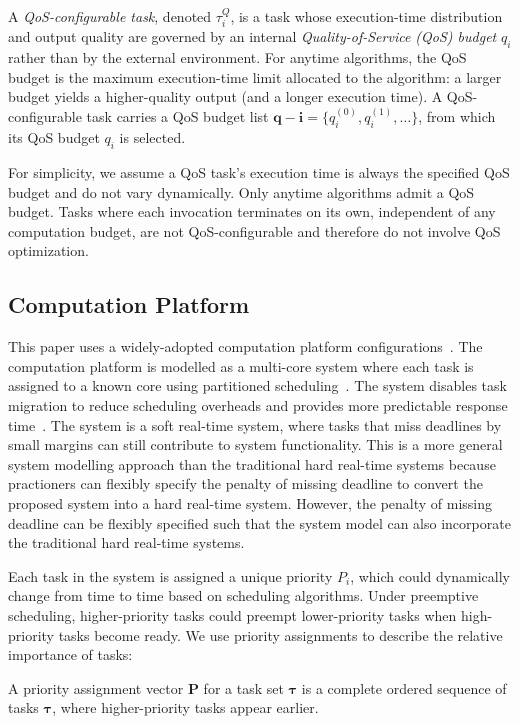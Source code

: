 	\begin{definition}
		\label{def_task_config}
		A \emph{QoS-configurable task}, denoted $\tau^Q_i$,
		is a task whose execution-time distribution and output quality are governed by an internal \emph{Quality-of-Service (QoS) budget} $q_i$ rather than by the external environment.
		For anytime algorithms, the QoS budget is the maximum execution-time limit allocated to the algorithm: a larger budget yields a higher-quality output (and a longer execution time).
		A QoS-configurable task carries a QoS budget list $\boldsymbol{q-i} = \{q_i^{(0)}, q_i^{(1)}, \dots\}$, from which its QoS budget $q_i$ is selected.
	\end{definition}

	For simplicity, we assume a QoS task's execution time is always the specified QoS budget and do not vary dynamically.
	Only anytime algorithms admit a QoS budget.
	Tasks where each invocation terminates on its own, independent of any computation budget, are not QoS-configurable and therefore do not involve QoS optimization.


	\subsection{Computation Platform}
	\label{section_rta_distribution}
    This paper uses a widely-adopted computation platform configurations~\cite{Ash23RAL, Wang2023OptimizingLET, Verucchi2020LatencyAwareGO}.
	The computation platform is modelled as a multi-core system where each task is assigned to a known core using partitioned scheduling~\cite{Buttazzo2011HardRC}.
	The system disables task migration to reduce scheduling overheads and provides more predictable response time~\cite{Brandenburg2016GlobalSN}.
    The system is a soft real-time system, where tasks that miss deadlines by small margins can still contribute to system functionality.
    This is a more general system modelling approach than the traditional hard real-time systems
    because practioners can flexibly specify the penalty of missing deadline to convert the proposed system into a hard real-time system.
	However, the penalty of missing deadline can be flexibly specified such that the system model can also incorporate the traditional hard real-time systems.

    Each task in the system is assigned a unique priority $P_i$, which could dynamically change from time to time based on scheduling algorithms.
    Under preemptive scheduling, higher-priority tasks could preempt lower-priority tasks when high-priority tasks become ready.
	We use priority assignments to describe the relative importance of tasks:
	\begin{definition}
		A priority assignment vector $\boldsymbol{P}$ for a task set $\boldsymbol{\tau}$ is a complete ordered sequence of tasks $\boldsymbol{\tau}$, where higher-priority tasks appear earlier.
	\end{definition}

